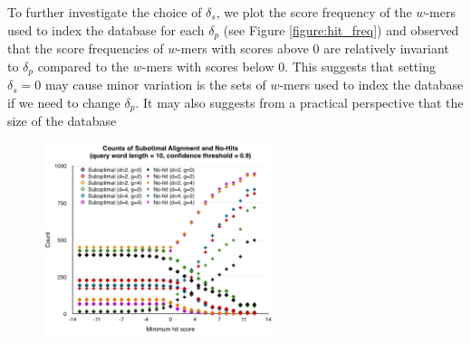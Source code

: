 \documentclass{article}
\begin{document}
To further investigate the choice of $\delta_s$, we plot the score frequency of the $w$-mers used to index the database for each $\delta_p$ (see Figure \ref{figure:hit_freq}) and observed that the score frequencies of $w$-mers with scores above 0 are relatively invariant to $\delta_p$ compared to the $w$-mers with scores below 0. This suggests that setting $\delta_s = 0$ may cause minor variation is the sets of $w$-mers used to index the database if we need to change $\delta_p$. It may also suggests from a practical perspective that the size of the database 

\begin{figure}[tbp]
\begin{center}
\caption{}
  \includegraphics[width=0.60\textwidth]{counts-10}
  \label{figure:counts_10}
\end{center}
\end{figure}
\end{document}
